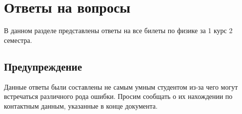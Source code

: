 \documentclass{extarticle}
\begin{document}
	

	\tableofcontents
	\newpage
	\section{Ответы на вопросы}
	В данном разделе представлены ответы на все билеты по физике за 1 курс 2 семестра.

	\subsection*{Предупреждение}
	Данные ответы были составлены не самым умным студентом из-за чего могут встречаться различного рода ошибки. Просим сообщать о их нахождении по контактным данным, указанные в конце документа.

	\nopagebreak
	
	
	
	
	
	
	
	
	
	
	
	
	
	
	
	
	
	
	
	
	
	
	
	
	
	
	
	
	
	
	
	
	
	
	


	
\end{document}
